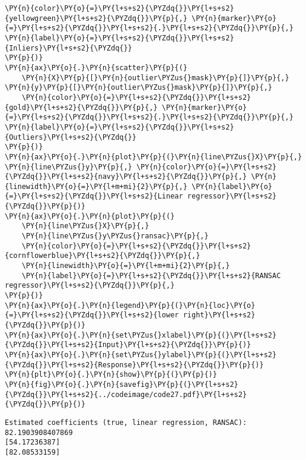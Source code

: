 \begin{Verbatim}[commandchars=\\\{\}]
    \PY{n}{color}\PY{o}{=}\PY{l+s+s2}{\PYZdq{}}\PY{l+s+s2}{yellowgreen}\PY{l+s+s2}{\PYZdq{}}\PY{p}{,} \PY{n}{marker}\PY{o}{=}\PY{l+s+s2}{\PYZdq{}}\PY{l+s+s2}{.}\PY{l+s+s2}{\PYZdq{}}\PY{p}{,} \PY{n}{label}\PY{o}{=}\PY{l+s+s2}{\PYZdq{}}\PY{l+s+s2}{Inliers}\PY{l+s+s2}{\PYZdq{}}
\PY{p}{)}
\PY{n}{ax}\PY{o}{.}\PY{n}{scatter}\PY{p}{(}
    \PY{n}{X}\PY{p}{[}\PY{n}{outlier\PYZus{}mask}\PY{p}{]}\PY{p}{,} \PY{n}{y}\PY{p}{[}\PY{n}{outlier\PYZus{}mask}\PY{p}{]}\PY{p}{,} 
    \PY{n}{color}\PY{o}{=}\PY{l+s+s2}{\PYZdq{}}\PY{l+s+s2}{gold}\PY{l+s+s2}{\PYZdq{}}\PY{p}{,} \PY{n}{marker}\PY{o}{=}\PY{l+s+s2}{\PYZdq{}}\PY{l+s+s2}{.}\PY{l+s+s2}{\PYZdq{}}\PY{p}{,} \PY{n}{label}\PY{o}{=}\PY{l+s+s2}{\PYZdq{}}\PY{l+s+s2}{Outliers}\PY{l+s+s2}{\PYZdq{}}
\PY{p}{)}
\PY{n}{ax}\PY{o}{.}\PY{n}{plot}\PY{p}{(}\PY{n}{line\PYZus{}X}\PY{p}{,} \PY{n}{line\PYZus{}y}\PY{p}{,} \PY{n}{color}\PY{o}{=}\PY{l+s+s2}{\PYZdq{}}\PY{l+s+s2}{navy}\PY{l+s+s2}{\PYZdq{}}\PY{p}{,} \PY{n}{linewidth}\PY{o}{=}\PY{l+m+mi}{2}\PY{p}{,} \PY{n}{label}\PY{o}{=}\PY{l+s+s2}{\PYZdq{}}\PY{l+s+s2}{Linear regressor}\PY{l+s+s2}{\PYZdq{}}\PY{p}{)}
\PY{n}{ax}\PY{o}{.}\PY{n}{plot}\PY{p}{(}
    \PY{n}{line\PYZus{}X}\PY{p}{,}
    \PY{n}{line\PYZus{}y\PYZus{}ransac}\PY{p}{,}
    \PY{n}{color}\PY{o}{=}\PY{l+s+s2}{\PYZdq{}}\PY{l+s+s2}{cornflowerblue}\PY{l+s+s2}{\PYZdq{}}\PY{p}{,}
    \PY{n}{linewidth}\PY{o}{=}\PY{l+m+mi}{2}\PY{p}{,}
    \PY{n}{label}\PY{o}{=}\PY{l+s+s2}{\PYZdq{}}\PY{l+s+s2}{RANSAC regressor}\PY{l+s+s2}{\PYZdq{}}\PY{p}{,}
\PY{p}{)}
\PY{n}{ax}\PY{o}{.}\PY{n}{legend}\PY{p}{(}\PY{n}{loc}\PY{o}{=}\PY{l+s+s2}{\PYZdq{}}\PY{l+s+s2}{lower right}\PY{l+s+s2}{\PYZdq{}}\PY{p}{)}
\PY{n}{ax}\PY{o}{.}\PY{n}{set\PYZus{}xlabel}\PY{p}{(}\PY{l+s+s2}{\PYZdq{}}\PY{l+s+s2}{Input}\PY{l+s+s2}{\PYZdq{}}\PY{p}{)}
\PY{n}{ax}\PY{o}{.}\PY{n}{set\PYZus{}ylabel}\PY{p}{(}\PY{l+s+s2}{\PYZdq{}}\PY{l+s+s2}{Response}\PY{l+s+s2}{\PYZdq{}}\PY{p}{)}
\PY{n}{plt}\PY{o}{.}\PY{n}{show}\PY{p}{(}\PY{p}{)}
\PY{n}{fig}\PY{o}{.}\PY{n}{savefig}\PY{p}{(}\PY{l+s+s2}{\PYZdq{}}\PY{l+s+s2}{../codeimage/code27.pdf}\PY{l+s+s2}{\PYZdq{}}\PY{p}{)}
\end{Verbatim}

\begin{Verbatim}[commandchars=\\\{\}]
Estimated coefficients (true, linear regression, RANSAC):
82.1903908407869
[54.17236387]
[82.08533159]
\end{Verbatim}
